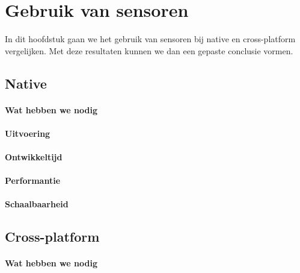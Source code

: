 
\chapter{Gebruik van sensoren}%
\label{ch:sensoren}

In dit hoofdstuk gaan we het gebruik van sensoren bij native en cross-platform vergelijken. 
Met deze resultaten kunnen we dan een gepaste conclusie vormen.

\section{Native}
\subsubsection{Wat hebben we nodig}

\subsubsection{Uitvoering}



\subsubsection{Ontwikkeltijd}



\subsubsection{Performantie}



\subsubsection{Schaalbaarheid}




\section{Cross-platform}
\subsubsection{Wat hebben we nodig}

